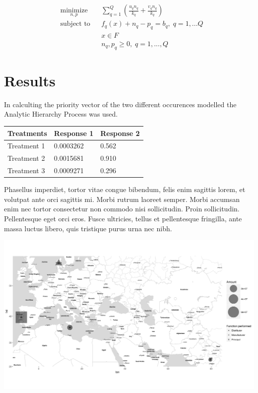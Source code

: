 \documentclass[a0,portrait]{a0poster}
\begin{document}
\begin{multicols}{2}
\begin{equation*}
\begin{aligned}
& \underset{n,p}{\text{minimize}}
& & \sum_{q=1}^{Q}(\frac{u_q n_q}{k_q}+\frac{v_q n_q}{k_q}) \\
& \text{subject to}
& & f_q(x)+n_q-p_q=b_q, \; q=1,...Q \\
& & & x\in F \\
& & & n_q,p_q\geq 0, \; q=1,...,Q 
\end{aligned}
\end{equation*}



\section*{Results}
In calculting the priority vector of the two different occurences modelled the Analytic Hierarchy Process\cite{Saaty1980} was used.
\\
\begin{tabular}{l l l}
\toprule
\textbf{Treatments} & \textbf{Response 1} & \textbf{Response 2}\\
\midrule
Treatment 1 & 0.0003262 & 0.562 \\
Treatment 2 & 0.0015681 & 0.910 \\
Treatment 3 & 0.0009271 & 0.296 \\
\bottomrule
\end{tabular}

Phasellus imperdiet, tortor vitae congue bibendum, felis enim sagittis lorem, et volutpat ante orci sagittis mi. Morbi rutrum laoreet semper. Morbi accumsan enim nec tortor consectetur non commodo nisi sollicitudin. Proin sollicitudin. Pellentesque eget orci eros. Fusce ultricies, tellus et pellentesque fringilla, ante massa luctus libero, quis tristique purus urna nec nibh.

\begin{center}\vspace{1cm}
\includegraphics[width=0.8\linewidth]{allocation_map.png}
\end{center}\vspace{1cm}


\end{multicols}
\end{document}

